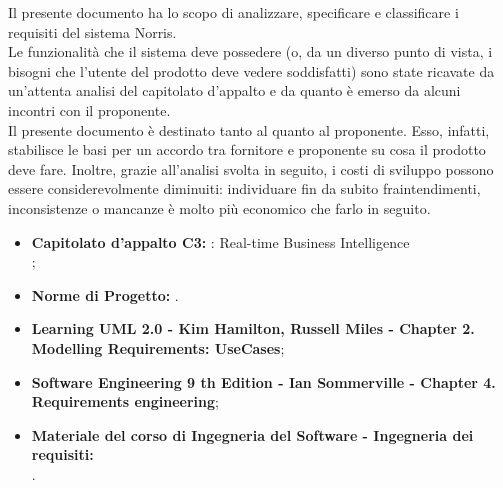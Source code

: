 
		Il presente documento ha lo scopo di analizzare, specificare e classificare i requisiti del sistema Norris.\\
		Le funzionalità che il sistema deve possedere (o, da un diverso punto di vista, i bisogni che l'utente del prodotto deve vedere soddisfatti) sono state ricavate da un'attenta analisi del capitolato d'appalto e da quanto è emerso da alcuni incontri con il proponente.\\
		Il presente documento è destinato tanto al  quanto al proponente. Esso, infatti, stabilisce le basi per un accordo tra fornitore e proponente su cosa il prodotto deve fare. Inoltre, grazie all'analisi svolta in seguito, i costi di sviluppo possono essere considerevolmente diminuiti: individuare fin da subito fraintendimenti, inconsistenze o mancanze è molto più economico che farlo in seguito.
	
	

		\begin{itemize}
			\item\textbf{Capitolato d'appalto C3:} \projectname{}: Real-time Business Intelligence \\
				;
			\item \textbf{Norme di Progetto:} .
		\end{itemize}
		\begin{itemize}
			\item \textbf{Learning UML 2.0 - Kim Hamilton, Russell Miles - Chapter 2. Modelling Requirements: UseCases};
			\item \textbf{Software Engineering 9 th Edition - Ian Sommerville - Chapter 4. Requirements engineering};
			\item \textbf{Materiale del corso di Ingegneria del Software - Ingegneria dei requisiti:} \\
				.
		\end{itemize}
